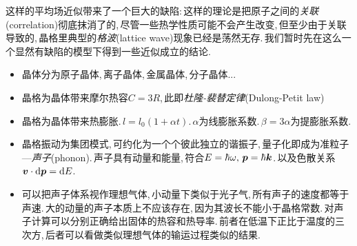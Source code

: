 这样的平均场近似带来了一个巨大的缺陷:\,这样的理论是把原子之间的\emph{关联}(correlation)彻底抹消了的,\,尽管一些热学性质可能不会产生改变,\,但至少由于关联导致的,\,晶格里典型的\emph{格波}(lattice wave)现象已经是荡然无存.\,我们暂时先在这么一个显然有缺陷的模型下得到一些近似成立的结论.












\begin{itemize}
	\item 晶体分为原子晶体,\,离子晶体,\,金属晶体,\,分子晶体...
	\item 晶格为晶体带来摩尔热容$C=3R$,\,此即\emph{杜隆-裴替定律}(Dulong-Petit law)
	\item 晶格为晶体带来热膨胀.\,$l=l_0(1+\alpha t)$.\,$\alpha$为线膨胀系数.\,$\beta=3\alpha$为提膨胀系数.
\end{itemize}

\begin{itemize}
	\item 晶格振动为集团模式,\,可约化为一个个彼此独立的谐振子,\,量子化即成为准粒子---\emph{声子}(phonon).\,声子具有动量和能量,\,符合$E=\hbar\omega,\,\boldsymbol{p}=\hbar\boldsymbol{k}$.\,以及色散关系$\boldsymbol{v}\cdot \textrm{d} \boldsymbol{p}=\textrm{d} E$.
	\item 可以把声子体系视作理想气体,\,小动量下类似于光子气,\,所有声子的速度都等于声速.\,大的动量的声子本质上不应该存在,\,因为其波长不能小于晶格常数.\,对声子计算可以分别正确给出固体的热容和热导率.\,前者在低温下正比于温度的三次方,\,后者可以看做类似理想气体的输运过程类似的结果.
\end{itemize}


